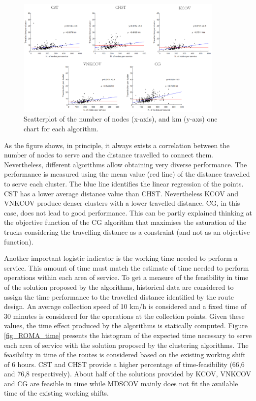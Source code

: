 \begin{figure}[hbt!]
\centering
\includegraphics[width=0.9\textwidth]{SectionDistribution/design_figures/fig_ROMA_rette.png}
\captionsetup{type=figure}
\caption{Scatterplot of the number of nodes (x-axis), and km (y-axs) one chart for each algorithm.}
\label{fig_ROMA_rette}
\end{figure}

As the figure shows, in principle, it always exists a correlation between the number of nodes to serve and the distance travelled to connect them. Nevertheless, different algorithms allow obtaining very diverse performance. The performance is measured using the mean value (red line) of the distance travelled to serve each cluster. The blue line identifies the linear regression of the points. CST has a lower average distance value than CHST. Nevertheless KCOV and VNKCOV produce denser clusters with a lower travelled distance. CG, in this case, does not lead to good performance. This can be partly explained thinking at the objective function of the CG algorithm that maximises the saturation of the trucks considering the travelling distance as a constraint (and not as an objective function). \par

Another important logistic indicator is the working time needed to perform a service. This amount of time must match the estimate of time needed to perform operations within each area of service. To get a measure of the feasibility in time of the solution proposed by the algorithms, historical data are considered to assign the time performance to the travelled distance identified by the route design. An average collection speed of 10 km/h is considered and a fixed time of 30 minutes is considered for the operations at the collection points. Given these values, the time effect produced by the algorithms is statically computed. Figure \ref{fig_ROMA_time} presents the histogram of the expected time necessary to serve each area of service with the solution proposed by the clustering algorithms. The feasibility in time of the routes is considered based on the existing working shift of 6 hours. CST and CHST provide a higher percentage of time-feasibility (66,6 and 76,8 respectively). About half of the solutions provided by KCOV, VNKCOV and CG are feasible in time while MDSCOV mainly does not fit the available time of the existing working shifts.

